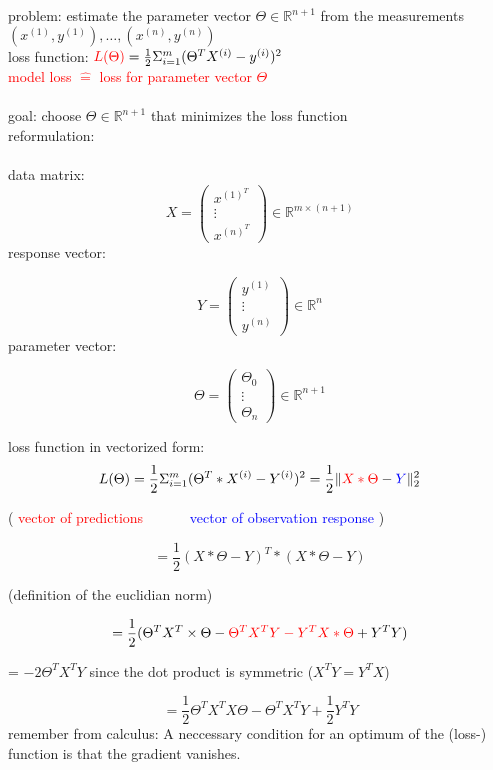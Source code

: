 	 problem: estimate the parameter vector $\Theta \in \mathbb{R}^{n+1}$ from the measurements $(x^{(1)}, y^{(1)}), \dots , (x^{(n)}, y^{(n)})$\\
	loss function: $\textcolor{red}{L(\Theta)} = \frac{1}{2} \Sigma^m_{i=1} (\Theta^T X^{(i)} - y^{(i)})^2$\\
	\textcolor{red}{model loss $\hat{=}$ loss for parameter vector $\Theta$}\\\\
	goal: choose $\Theta \in \mathbb{R}^{n+1}$ that minimizes the loss function\\
	reformulation:\\\\
	data matrix:
	\[ X =\left( \begin{array}{ccc}
	x^{(1)^T} \\
	\vdots \\
	x^{(n)^T} \end{array} \right) \in \mathbb{R}^{m \times (n+1)}\]
	response vector:
	
	\[ Y =\left( \begin{array}{ccc}
	y^{(1)} \\
	\vdots \\
	y^{(n)} \end{array} \right) \in \mathbb{R}^n\]
	parameter vector:
	
	\[ \Theta =\left( \begin{array}{ccc}
	\Theta_0 \\
	\vdots \\
	\Theta_n \end{array} \right) \in \mathbb{R}^{n+1}\]

	loss function in vectorized form:
	\[L(\Theta) = \frac{1}{2} \Sigma^m_{i=1} (\Theta^T * X^{(i)} - Y^{(i)})^2 = \frac{1}{2} \lVert \textcolor{red}{X * \Theta} - \textcolor{blue}{Y} \lVert^2_2\]
	
	\begin{center}
	( \textcolor{red}{vector of predictions}$\quad\quad\quad$ \textcolor{blue}{vector of observation response} )
	\end{center}
	\[ = \frac{1}{2} (X * \Theta -Y)^T * (X * \Theta - Y)\]
	\begin{center}
	(definition of the euclidian norm)
	\end{center}
	\[ = \frac{1}{2} (\Theta^T X^T \times \Theta - \textcolor{red}{\Theta^T X^T Y - Y^T X*\Theta} + Y^T Y)\]
	\begin{center}
	= $-2 \Theta^T X^T Y$ since the dot product is symmetric ($X^T Y = Y^T X$)
	\end{center}
	\[= \frac{1}{2} \Theta^T X^T X \Theta - \Theta^T X^T Y + \frac{1}{2} Y^T Y\]
	remember from calculus: A neccessary condition for an optimum of the (loss-) function is that the gradient vanishes.\\
	
